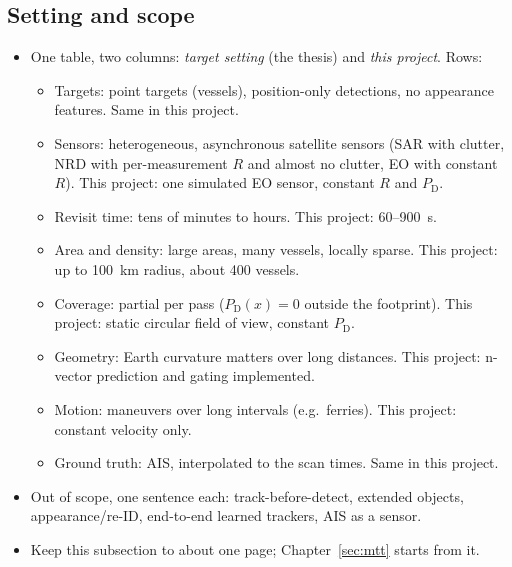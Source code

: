 \subsection{Setting and scope}
\label{sec:scope}
\begin{itemize}
    \item One table, two columns: \emph{target setting} (the thesis) and \emph{this project}. Rows:
    \begin{itemize}
        \item Targets: point targets (vessels), position-only detections, no appearance features. Same in this project.
        \item Sensors: heterogeneous, asynchronous satellite sensors (SAR with clutter, NRD with per-measurement $R$ and almost no clutter, EO with constant $R$). This project: one simulated EO sensor, constant $R$ and $P_{\mathrm{D}}$.
        \item Revisit time: tens of minutes to hours. This project: 60--900~s.
        \item Area and density: large areas, many vessels, locally sparse. This project: up to 100~km radius, about 400 vessels.
        \item Coverage: partial per pass ($P_{\mathrm{D}}(x)=0$ outside the footprint). This project: static circular field of view, constant $P_{\mathrm{D}}$.
        \item Geometry: Earth curvature matters over long distances. This project: n-vector prediction and gating implemented.
        \item Motion: maneuvers over long intervals (e.g.\ ferries). This project: constant velocity only.
        \item Ground truth: AIS, interpolated to the scan times. Same in this project.
    \end{itemize}
    \item Out of scope, one sentence each: track-before-detect, extended objects, appearance/re-ID, end-to-end learned trackers, AIS as a sensor.
    \item Keep this subsection to about one page; Chapter~\ref{sec:mtt} starts from it.
\end{itemize}


